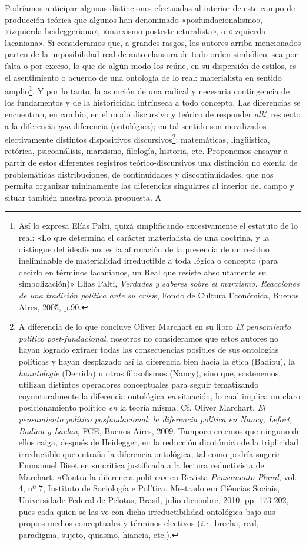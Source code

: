 Podríamos anticipar algunas distinciones efectuadas al interior de este campo de producción teórica que algunos han denominado «posfundacionalismo», «izquierda heideggeriana», «marxismo postestructuralista», o «izquierda lacaniana». Si consideramos que, a grandes rasgos, los autores arriba mencionados parten de la imposibilidad real de auto-clausura de todo orden simbólico, sea por falta o por exceso, lo que de algún modo los reúne, en su dispersión de estilos, es el asentimiento o acuerdo de una ontología de lo real: materialista en sentido amplio\footnote{Así lo expresa Elías Palti, quizá simplificando excesivamente el estatuto de lo real: «Lo que determina el carácter materialista de una doctrina, y la distingue del idealismo, es la afirmación de la presencia de un residuo ineliminable de materialidad irreductible a toda lógica o concepto (para decirlo en términos lacanianos, un Real que resiste absolutamente su simbolización)» Elías Palti, \emph{Verdades y saberes sobre el marxismo. Reacciones de una tradición política ante su crisi}s, Fondo de Cultura Económica, Buenos Aires, 2005, p.90.}. Y por lo tanto, la asunción de una radical y necesaria contingencia de los fundamentos y de la historicidad intrínseca a todo concepto. Las diferencias se encuentran, en cambio, en el modo discursivo y teórico de responder \emph{allí}, respecto a la diferencia \emph{qua} diferencia (ontológica); en tal sentido son movilizados electivamente distintos dispositivos discursivos\footnote{A diferencia de lo que concluye Oliver Marchart en su libro \emph{El pensamiento político post-fundacional}, nosotros no consideramos que estos autores no hayan logrado extraer todas las consecuencias posibles de sus ontologías políticas y hayan desplazado así la diferencia bien hacia la ética (Badiou), la \emph{hauntologie} (Derrida) u otros filosofismos (Nancy), sino que, sostenemos, utilizan distintos operadores conceptuales para seguir tematizando coyunturalmente la diferencia ontológica \emph{en} situación, lo cual implica un claro posicionamiento político \emph{en} la teoría misma. Cf. Oliver Marchart, \emph{El pensamiento político posfundacional: la diferencia política en Nancy, Lefort, Badiou y Laclau}, FCE, Buenos Aires, 2009. Tampoco creemos que ninguno de ellos caiga, después de Heidegger, en la reducción dicotómica de la triplicidad irreductible que entraña la diferencia ontológica, tal como podría sugerir Emmanuel Biset en su crítica justificada a la lectura reductivista de Marchart. «Contra la diferencia política» en Revista \emph{Pensamento Plural}, vol. 4, nº 7, Instituto de Sociología e Política, Mestrado em Ciências Sociais, Universidade Federal de Pelotas, Brasil, julio-diciembre, 2010, pp. 173-202, pues cada quien se las ve con dicha irreductibilidad ontológica bajo sus propios medios conceptuales y términos electivos (\emph{i.e.} brecha, real, paradigma, sujeto, quiasmo, hiancia, etc.).}: matemáticas, lingüística, retórica, psicoanálisis, marxismo, filología, historia, etc. Proponemos ensayar a partir de estos diferentes registros teórico-discursivos una distinción no exenta de problemáticas distribuciones, de continuidades y discontinuidades, que nos permita organizar mininamente las diferencias singulares al interior del campo y situar también nuestra propia propuesta. A 
